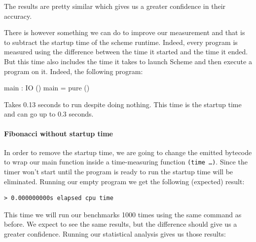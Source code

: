 \documentclass[
]{article}
\newenvironment{Shaded}{}{}
\newcommand{\DataTypeTok}[1]{\textcolor[rgb]{0.56,0.13,0.00}{#1}}
\newcommand{\FunctionTok}[1]{\textcolor[rgb]{0.02,0.16,0.49}{#1}}
\newcommand{\NormalTok}[1]{#1}
\newcommand{\OperatorTok}[1]{\textcolor[rgb]{0.40,0.40,0.40}{#1}}
\newcommand{\OtherTok}[1]{\textcolor[rgb]{0.00,0.44,0.13}{#1}}
\begin{document}
The results are pretty similar which gives us a greater confidence in
their accuracy.

There is however something we can do to improve our measurement and that
is to subtract the startup time of the scheme runtime. Indeed, every
program is measured using the difference between the time it started and
the time it ended. But this time also includes the time it takes to
launch Scheme and then execute a program on it. Indeed, the following
program:

\begin{Shaded}
\begin{Highlighting}[]
\NormalTok{main }\OperatorTok{:} \DataTypeTok{IO}\NormalTok{ ()}
\NormalTok{main }\OtherTok{=} \FunctionTok{pure}\NormalTok{ ()}
\end{Highlighting}
\end{Shaded}

Takes 0.13 seconds to run despite doing nothing. This time is the
startup time and can go up to 0.3 seconds.

\hypertarget{fibonacci-without-startup-time}{%
\paragraph{Fibonacci without startup
time}\label{fibonacci-without-startup-time}}

In order to remove the startup time, we are going to change the emitted
bytecode to wrap our main function inside a time-measuring function
\texttt{(time\ \ldots{})}. Since the timer won't start until the program
is ready to run the startup time will be eliminated. Running our empty
program we get the following (expected) result:

\begin{verbatim}
> 0.000000000s elapsed cpu time
\end{verbatim}

This time we will run our benchmarks 1000 times using the same command
as before. We expect to see the same results, but the difference should
give us a greater confidence. Running our statistical analysis gives us
those results:
\end{document}
